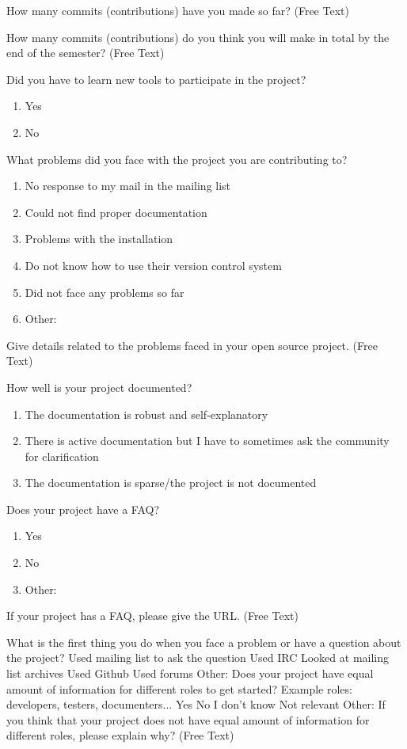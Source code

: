 How many commits (contributions) have you made so far? (Free Text)

How many commits (contributions) do you think you will make in total by the end of the semester? (Free Text)

Did you have to learn new tools to participate in the project?
\begin{enumerate}
\item Yes
\item No
\end{enumerate}

What problems did you face with the project you are contributing to?
\begin{enumerate}
\item No response to my mail in the mailing list
\item Could not find proper documentation
\item Problems with the installation
\item Do not know how to use their version control system
\item Did not face any problems so far
\item Other:
\end{enumerate}

Give details related to the problems faced in your open source project. (Free Text)

How well is your project documented?
\begin{enumerate}
\item The documentation is robust and self-explanatory
\item There is active documentation but I have to sometimes ask the community for clarification
\item The documentation is sparse/the project is not documented
\end{enumerate}

Does your project have a FAQ?
\begin{enumerate}
\item Yes
\item No
\item Other:
\end{enumerate}

If your project has a FAQ, please give the URL. (Free Text)

What is the first thing you do when you face a problem or have a question about the project? Used mailing list to ask the question Used IRC Looked at mailing list archives Used Github Used forums Other: Does your project have equal amount of information for different roles to get started? Example roles: developers, testers, documenters... Yes No I don't know Not relevant Other: If you think that your project does not have equal amount of information for different roles, please explain why? (Free Text)

